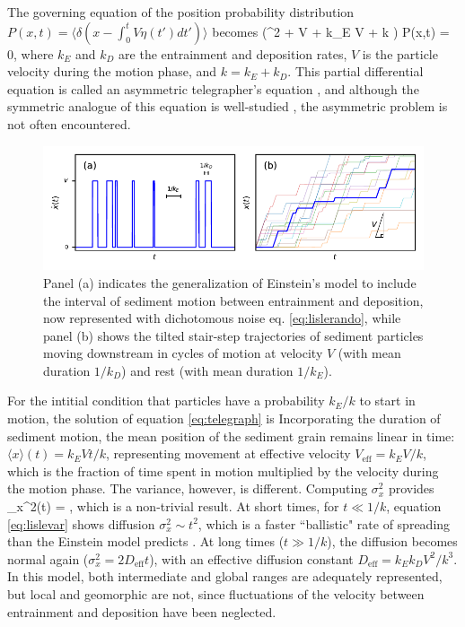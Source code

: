 The governing equation of the position probability distribution $P(x,t) = \langle \delta(x-\int_0^t V\eta(t')dt') \rangle$ becomes \citep{Balakrishnan1993}
\be \big(\pt^2 + V \px \pt + k_E V \px + k \pt \big) P(x,t) = 0,\ee
where $k_E$ and $k_D$ are the entrainment and deposition rates, $V$ is the particle velocity during the motion phase, and $k = k_E+k_D$. This partial differential equation is called an asymmetric telegrapher's equation \citep{Rossetto2018}, and although the symmetric analogue of this equation is well-studied \citep{Weiss2002a, Masoliver2017}, the asymmetric problem is not often encountered.
\begin{figure}[!htbp]
	\includegraphics[width=\linewidth,keepaspectratio]{./figures/ch1/lisleConcept.pdf}
	\caption{Panel (a) indicates the generalization of Einstein's model to include the interval of sediment motion between entrainment and deposition, now represented with dichotomous noise eq. \ref{eq:lislerando}, while panel (b) shows the tilted stair-step trajectories of sediment particles moving downstream in cycles of motion at velocity $V$ (with mean duration $1/k_D$) and rest (with mean duration $1/k_E$). }
	\label{fig:lislefig}
\end{figure}

For the intitial condition that particles have a probability $k_E/k$ to start in motion, the solution of equation \ref{eq:telegraph} is \citep{Lisle1998}
\be \ee
Incorporating the duration of sediment motion, the mean position of the sediment grain remains linear in time: $\langle x \rangle (t) = k_E V t/k$, representing movement at effective velocity $V_\text{eff} = k_E V/k$, which is the fraction of time spent in motion multiplied by the velocity during the motion phase. The variance, however, is different.
Computing $\sigma_x^2$ provides
\be \sigma_x^2(t) = ,\ee
which is a non-trivial result. At short times, for $t\ll 1/k$, equation \ref{eq:lislevar} shows diffusion $\sigma_x^2 \sim t^2$, which is a faster ``ballistic" rate of spreading than the Einstein model predicts \citep{Sokolov2012}. At long times ($t\gg 1/k$), the diffusion becomes normal again ($\sigma_x^2 = 2 D_\text{eff} t$), with an effective diffusion constant $ D_\text{eff} = k_E k_D V^2/k^3$.
In this model, both intermediate and global ranges are adequately represented, but local and geomorphic are not, since fluctuations of the velocity between entrainment and deposition have been neglected.

